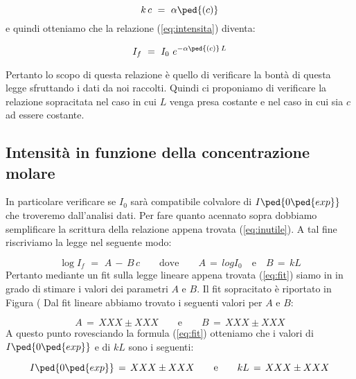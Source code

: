 \begin{equation}
	k\,c \,\,=\,\, \alpha\ped{(c)}
\end{equation}
%
e quindi otteniamo che la relazione (\ref{eq:intensita}) diventa:

\begin{equation}
	I_f \,\,=\,\, I_0 \,\, e^{-\alpha\ped{(c)}\,L}
	\label{eq:inutile}
\end{equation}
%

Pertanto lo scopo di questa relazione è quello di verificare la bontà di questa legge sfruttando i dati da noi raccolti.
Quindi ci proponiamo di verificare la relazione sopracitata nel caso in cui $L$ venga presa costante e nel caso in cui sia $c$ ad essere costante.

\subsection{Intensità in funzione della concentrazione molare}

 In particolare verificare se $I_0$ sarà compatibile colvalore di $I\ped{0\ped{exp}}$ che troveremo dall'analisi dati.
Per fare quanto acennato sopra dobbiamo semplificare la scrittura della relazione appena trovata (\ref{eq:inutile}).
A tal fine riscriviamo la legge nel seguente modo:

\begin{equation}
	\log{I_f} \,\,=\,\, A \,-\, B \, c \qquad \text{dove} \qquad A \,=\, log{I_0} \quad \text{e} \quad B\,=\, kL
	\label{eq:fit}
\end{equation}
%
Pertanto mediante un fit sulla legge lineare appena trovata (\ref{eq:fit}) siamo in in grado di stimare i valori dei parametri
$A$ e $B$. Il fit sopracitato è riportato in Figura (%
Dal fit lineare abbiamo trovato i seguenti valori per $A$ e $B$:

\begin{equation*}
	A \,=\, XXX \pm XXX \qquad \text{e} \qquad B \,=\, XXX \pm XXX
\end{equation*}
%
A questo punto rovesciando la formula (\ref{eq:fit}) otteniamo che i valori di $I\ped{0\ped{exp}}$ e di $kL$ sono i seguenti:

\begin{equation}
	I\ped{0\ped{exp}} \,=\, XXX \pm XXX \qquad \text{e} \qquad kL \,=\, XXX \pm XXX
\end{equation}
%



